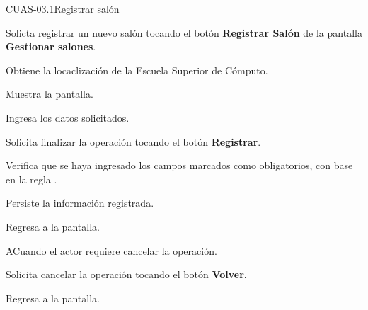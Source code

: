 \begin{UseCase}{CUAS-03.1}{Registrar salón}

 \end{UseCase}

 \begin{UCtrayectoria}
    
    \UCpaso [\UCactor] Solicta registrar un nuevo salón tocando el botón \textbf{Registrar Salón} de la pantalla \textbf{Gestionar salones}.
    
    \UCpaso Obtiene la locaclización de la Escuela Superior de Cómputo.
    
    \UCpaso Muestra la pantalla.
    
    \UCpaso [\UCactor] Ingresa los datos solicitados.
    
    \UCpaso [\UCactor] Solicita finalizar la operación tocando el botón \textbf{Registrar}. 
    
    \UCpaso Verifica que se haya ingresado los campos marcados como obligatorios, con base en la regla .
    
    \UCpaso Persiste la información registrada.
    
    \UCpaso Regresa a la pantalla.
    
\end{UCtrayectoria}

\begin{UCtrayectoriaA}{A}{Cuando el actor requiere cancelar la operación.}
	
	\UCpaso [\UCactor] Solicita cancelar la operación tocando el botón \textbf{Volver}.
	
	\UCpaso Regresa a la pantalla.
	
\end{UCtrayectoriaA}


